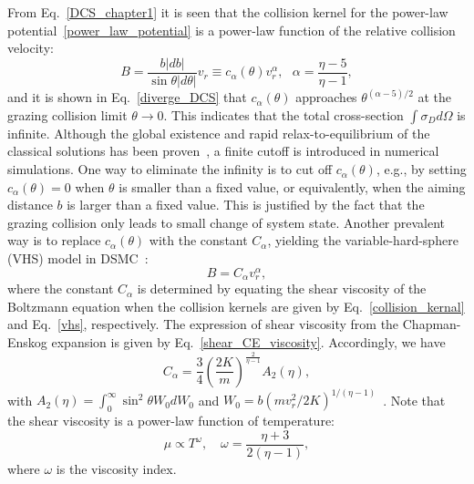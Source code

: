 From Eq.~\eqref{DCS_chapter1} it is seen that the collision kernel for the power-law potential~\eqref{power_law_potential} is a power-law function of the relative collision velocity:
\begin{equation}\label{collision_kernal}
B=    \frac{b|db|}{\sin\theta|d\theta|}v_r
\equiv{}c_\alpha(\theta)v_r^\alpha, \ \ \
\alpha=\frac{\eta-5}{\eta-1},
\end{equation}
and it is shown in Eq.~\eqref{diverge_DCS} that $c_\alpha(\theta)$ approaches  $\theta^{(\alpha-5)/2}$ at the grazing collision limit $\theta\rightarrow0$. This indicates that the total cross-section $\int\sigma_D{d}\Omega$ is infinite. Although the global existence and rapid relax-to-equilibrium of the classical solutions has been proven~\cite{Gressman2010}, a finite cutoff is introduced in numerical simulations. One way to eliminate the infinity is to cut off  $c_\alpha(\theta)$, e.g., by setting $c_\alpha(\theta)=0$ when $\theta$ is smaller than a fixed value, or equivalently, when the aiming distance $b$ is larger than a fixed value. This is justified by the fact that the grazing collision only leads to small change of system state. Another prevalent way is to replace $c_\alpha(\theta)$ with the constant $C_\alpha$, yielding the variable-hard-sphere (VHS) model in DSMC~\cite{Bird1994}:
\index{variable hard sphere}
\begin{equation}\label{vhs}
    B=C_\alpha{}v_r^\alpha,
\end{equation}
where the constant $C_\alpha$ is determined by equating the shear viscosity of the Boltzmann equation when the collision kernels are given by Eq.~\eqref{collision_kernal} and Eq.~\eqref{vhs}, respectively. The expression of shear viscosity from the Chapman-Enskog expansion is given by Eq.~\eqref{shear_CE_viscosity}. Accordingly, we have
\begin{equation}
  C_\alpha=\frac{3}{4}\left(\frac{2{K}}{m}\right)^{\frac{2}{\eta-1}}A_2(\eta),
\end{equation}
with  $A_2(\eta)=\int_0^\infty\sin^2\theta{}W_0dW_0$ and $W_0=b(mv_r^2/2{K})^{1/(\eta-1)}$~\cite{Bird1994}. Note that the shear viscosity is a power-law function of temperature:
\begin{equation}\label{temperature_dependence}
    \mu\propto{T^\omega}, \quad
    \omega=\frac{\eta+3}{2(\eta-1)},
\end{equation}
where $\omega$ is the viscosity index. 


